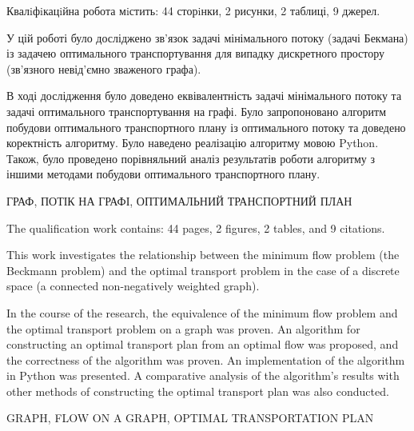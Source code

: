 \abstractUkr
Квалiфiкацiйна робота мiстить: 44 сторiнки, 2 рисунки, 2 таблиці,
9 джерел.

У цій роботі було досліджено зв'язок задачі мінімального потоку (задачі Бекмана) із
задачею оптимального транспортування для випадку дискретного простору (зв'язного невід'ємно зваженого графа).

В ході дослідження було доведено еквівалентність задачі мінімального потоку та задачі оптимального транспортування
на графі. Було запропоновано алгоритм побудови оптимального транспортного плану із оптимального потоку та доведено коректність алгоритму.
Було наведено реалізацію алгоритму мовою Python. Також, було проведено порівняльний аналіз результатів роботи алгоритму з 
іншими методами побудови оптимального транспортного плану.

\MakeUppercase{ГРАФ, ПОТІК НА ГРАФІ, ОПТИМАЛЬНИЙ ТРАНСПОРТНИЙ ПЛАН}

\abstractEng
The qualification work contains: 44 pages, 2 figures, 2 tables, and 9 citations.

This work investigates the relationship between the minimum flow problem (the Beckmann problem) and 
the optimal transport problem in the case of a discrete space (a connected non-negatively weighted graph).

In the course of the research, the equivalence of the minimum flow problem and the optimal transport problem on a graph was proven. 
An algorithm for constructing an optimal transport plan from an optimal flow was proposed,
 and the correctness of the algorithm was proven.
An implementation of the algorithm in Python was presented. A comparative analysis of the algorithm's results with other
methods of constructing the optimal transport plan was also conducted.

\MakeUppercase{GRAPH, FLOW ON A GRAPH, OPTIMAL TRANSPORTATION PLAN}
\clearpage